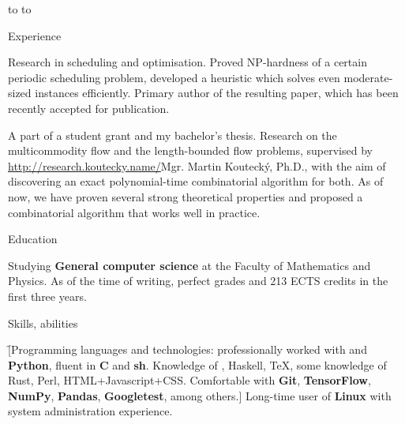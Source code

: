 


\newdimen\hei
\hei=1.5cm
\doublecolumns
 \vbox to 
 \vbox to 
\endcolumns

\doublecolumns

\sekce Experience

%
Research in scheduling and optimisation. Proved NP-hardness of a certain
periodic scheduling problem, developed a heuristic which solves even
moderate-sized instances efficiently. Primary author of the resulting paper,
which has been recently accepted for publication.

%
A part of a student grant and my bachelor's thesis. Research on the
multicommodity flow and the length-bounded flow problems, supervised by
\url{http://research.koutecky.name/}{Mgr. Martin Koutecký, Ph.D.}, with the aim
of discovering an exact polynomial-time combinatorial algorithm for both. As of now, we have proven
several strong theoretical properties and proposed a combinatorial algorithm
that works well in practice.

\sekce Education


Studying {\bf General computer science} at the Faculty of Mathematics and
Physics. As of the time of writing, perfect grades and 213 ECTS credits in the
first three years.

\sekce Skills, abilities

\f[Programming languages and technologies: professionally worked with {\bf
\Cpp} and {\bf Python}, fluent in {\bf C} and {\bf sh}. Knowledge of \Cis,
Haskell, \TeX, some knowledge of Rust, Perl, HTML+Javascript+CSS. Comfortable
with {\bf Git}, {\bf TensorFlow}, {\bf NumPy}, {\bf Pandas}, {\bf Googletest},
among others.] Long-time user of {\bf Linux} with system administration
experience.


